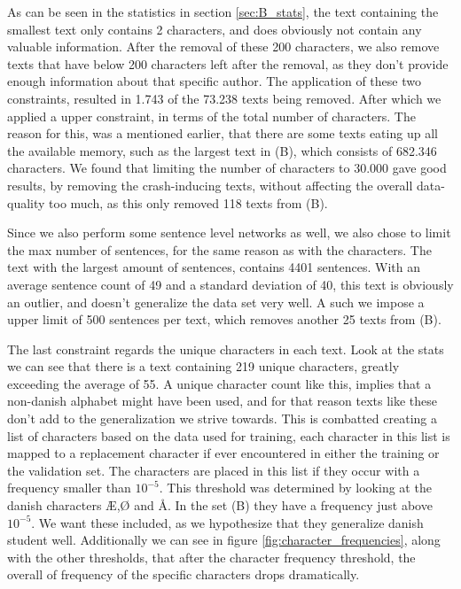 As can be seen in the statistics in section \ref{sec:B_stats}, the text
containing the smallest text only contains 2 characters, and does obviously not
contain any valuable information. After the removal of these 200 characters, we
also remove texts that have below 200 characters left after the removal, as they
don't provide enough information about that specific author. The application
of these two constraints, resulted in 1.743 of the 73.238 texts being removed.
After which we applied a upper constraint, in terms of the total number of
characters. The reason for this, was a mentioned earlier, that there are some
texts eating up all the available memory, such as the largest text in (B), which
consists of 682.346 characters. We found that limiting the number of characters
to 30.000 gave good results, by removing the crash-inducing texts, without
affecting the overall data-quality too much, as this only removed 118 texts from
(B).

Since we also perform some sentence level networks as well, we also chose to
limit the max number of sentences, for the same reason as with the characters.
The text with the largest amount of sentences, contains 4401 sentences. With
an average sentence count of 49 and a standard deviation of 40, this text is
obviously an outlier, and doesn't generalize the data set very well. A such we
impose a upper limit of 500 sentences per text, which removes another 25 texts
from (B).

The last constraint regards the unique characters in each text. Look at the
stats we can see that there is a text containing 219 unique characters, greatly
exceeding the average of 55. A unique character count like this, implies that a
non-danish alphabet might have been used, and for that reason texts like these
don't add to the generalization we strive towards. This is combatted creating a
list of characters based on the data used for training, each character in this
list is mapped to a replacement character if ever encountered in either the
training or the validation set. The characters are placed in this list if they
occur with a frequency smaller than $10^{-5}$. This threshold was determined
by looking at the danish characters Æ,Ø and Å. In the set (B) they have
a frequency just above $10^{-5}$. We want these included, as we hypothesize
that they generalize danish student well. Additionally we can see in figure
\ref{fig:character_frequencies}, along with the other thresholds, that after
the character frequency threshold, the overall of frequency of the specific
characters drops dramatically.

